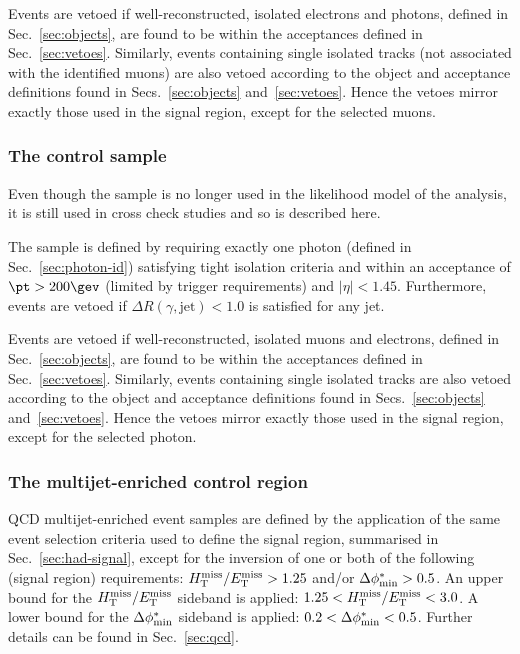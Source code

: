 Events are vetoed if well-reconstructed, isolated electrons and
photons, defined in Sec.~\ref{sec:objects}, are found to be within the
acceptances defined in Sec.~\ref{sec:vetoes}. Similarly, events
containing single isolated tracks (not associated with the identified
muons) are also vetoed according to the object and acceptance
definitions found in Secs.~\ref{sec:objects}
and~\ref{sec:vetoes}. Hence the vetoes mirror exactly those used in
the signal region, except for the selected muons.

\subsubsection{The \texorpdfstring{\gj}{photon + jets} control sample}
\label{sec:photoncontrolSelection}

Even though the \gj sample is no longer used in the likelihood model
of the analysis, it is still used in cross check studies and so is
described here.

The \gj sample is defined by requiring exactly one photon (defined in
Sec.~\ref{sec:photon-id}) satisfying tight isolation criteria and
within an acceptance of $\pt > 200\gev$ (limited by trigger
requirements) and $|\eta| < 1.45$. Furthermore, events are vetoed if
$\Delta R(\gamma,\textrm{jet}) < 1.0$ is satisfied for any jet.

Events are vetoed if well-reconstructed, isolated muons and electrons,
defined in Sec.~\ref{sec:objects}, are found to be within the
acceptances defined in Sec.~\ref{sec:vetoes}. Similarly, events
containing single isolated tracks are also vetoed according to the
object and acceptance definitions found in Secs.~\ref{sec:objects}
and~\ref{sec:vetoes}. Hence the vetoes mirror exactly those used in
the signal region, except for the selected photon.

\subsubsection{The multijet-enriched control region}
\label{sec:multijetcontrolSelection}

QCD multijet-enriched event samples are defined by the application of
the same event selection criteria used to define the signal region,
summarised in Sec.~\ref{sec:had-signal}, except for the inversion of
one or both of the following (signal region) requirements: $\mbox{$H_{\rm T}^{\rm miss}$}/\mbox{$E_\text{T}^{\rm miss}$}
> 1.25$ and/or $\mbox{$\Delta\phi^{*}_{\rm min}$} > 0.5$. An upper bound for the $\mbox{$H_{\rm T}^{\rm miss}$}/\mbox{$E_\text{T}^{\rm miss}$}$
sideband is applied: $1.25 < \mbox{$H_{\rm T}^{\rm miss}$}/\mbox{$E_\text{T}^{\rm miss}$} < 3.0$. A lower bound for the
$\mbox{$\Delta\phi^{*}_{\rm min}$}$ sideband is applied: $0.2 < \mbox{$\Delta\phi^{*}_{\rm min}$} < 0.5$. Further details
can be found in Sec.~\ref{sec:qcd}.

